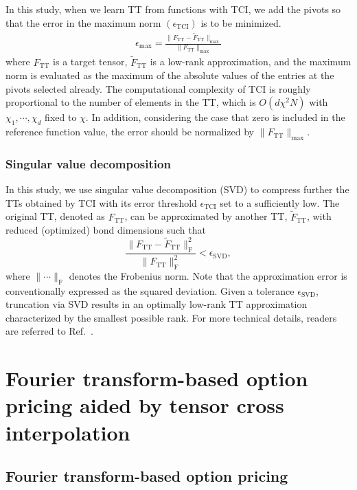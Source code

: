 In this study, when we learn TT from functions with TCI, we add the pivots so that the error in the maximum norm $(\epsilon_{\mathrm{TCI}})$ is to be minimized.
\begin{align}
    \epsilon_{\mathrm{max}} = \frac{\|F_{\mathrm{TT}}-\tilde{F}_{\mathrm{TT}}\|_{\mathrm{max}}}{\|F_{\mathrm{TT}}\|_{\mathrm{max}}}
    \label{eq:errTCI}
\end{align}
where $F_\mathrm{TT}$ is a target tensor, $\tilde F_\mathrm{TT}$ is a low-rank approximation, and the maximum norm is evaluated as the maximum of the absolute values of the entries at the pivots selected already.
The computational complexity of TCI is roughly proportional to the number of elements in the TT, which is $O(d \chi^2 N)$ with $\chi_1,\cdots,\chi_d$ fixed to $\chi$. 
In addition, considering the case that zero is included in the reference function value, the error should be normalized by $\|F_{\mathrm{TT}}\|_{\mathrm{max}}$.


\subsubsection{Singular value decomposition}
In this study, we use singular value decomposition (SVD) to compress further the TTs obtained by TCI with its error threshold $\epsilon_{\mathrm{TCI}}$ set to a sufficiently low.
The original TT, denoted as $F_{\mathrm{TT}}$, can be approximated by another TT, $\tilde{F}_{\mathrm{TT}}$, with reduced (optimized) bond dimensions such that
\begin{equation}
    \frac{\|F_{\mathrm{TT}} - \tilde{F}_{\mathrm{TT}}\|_{\mathrm{F}}^2}{\|F_{\mathrm{TT}}\|_{\mathrm{F}}^2} < \epsilon_{\mathrm{SVD}},
\end{equation}
where $\| \cdots \|_{\mathrm{F}}$ denotes the Frobenius norm. Note that the approximation error is conventionally expressed as the squared deviation. Given a tolerance $\epsilon_{\mathrm{SVD}}$, truncation via SVD results in an optimally low-rank TT approximation characterized by the smallest possible rank. 
For more technical details, readers are referred to Ref.~\cite{Schollwock2011-eq}.


\section{Fourier transform-based option pricing aided by tensor cross interpolation}


\subsection{Fourier transform-based option pricing}

